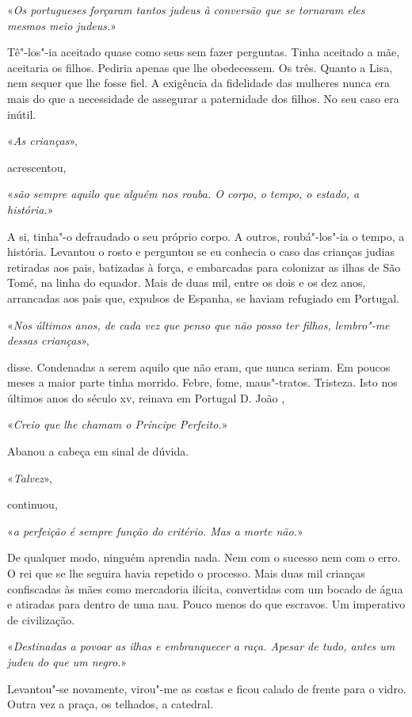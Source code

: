 «\emph{Os portugueses forçaram tantos judeus à conversão que se tornaram
eles mesmos meio judeus.}»

Tê"-los"-ia aceitado quase como seus sem fazer perguntas. Tinha aceitado
a mãe, aceitaria os filhos. Pediria apenas que lhe obedecessem. Os três.
Quanto a Lisa, nem sequer que lhe fosse fiel. A exigência da fidelidade
das mulheres nunca era mais do que a necessidade de assegurar a
paternidade dos filhos. No seu caso era inútil.

«\emph{As crianças}»,

acrescentou,

«\emph{são sempre aquilo que alguém nos rouba. O corpo, o tempo, o
estado, a história.}»

A si, tinha"-o defraudado o seu próprio corpo. A outros, roubá"-los"-ia
o tempo, a história. Levantou o rosto e perguntou se eu conhecia o caso
das crianças judias retiradas aos pais, batizadas à força, e embarcadas
para colonizar as ilhas de São Tomé, na linha do equador. Mais de duas
mil, entre os dois e os dez anos, arrancadas aos pais que, expulsos de
Espanha, se haviam refugiado em Portugal.

«\emph{Nos últimos anos, de cada vez que penso que não posso ter filhos,
lembro"-me dessas crianças}»,

disse. Condenadas a serem aquilo que não eram, que nunca seriam. Em
poucos meses a maior parte tinha morrido. Febre, fome, maus"-tratos.
Tristeza. Isto nos últimos anos do século xv, reinava em Portugal D.
João ,

«\emph{Creio que lhe chamam o Príncipe Perfeito.}»

Abanou a cabeça em sinal de dúvida.

«\emph{Talvez}»,

continuou,

«\emph{a perfeição é sempre função do critério. Mas a morte não.}»

De qualquer modo, ninguém aprendia nada. Nem com o sucesso nem com o
erro. O rei que se lhe seguira havia repetido o processo. Mais duas mil
crianças confiscadas às mães como mercadoria ilícita, convertidas com um
bocado de água e atiradas para dentro de uma nau. Pouco menos do que
escravos. Um imperativo de civilização.

«\emph{Destinadas a povoar as ilhas e embranquecer a raça. Apesar de
tudo, antes um judeu do que um negro.}»

Levantou"-se novamente, virou"-me as costas e ficou calado de frente
para o vidro. Outra vez a praça, os telhados, a catedral.

